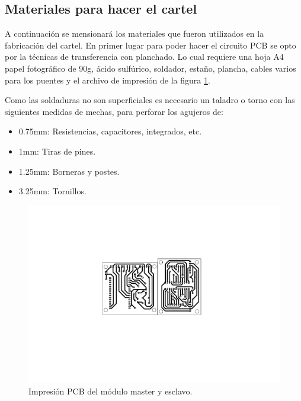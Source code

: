 \subsection{Materiales para hacer el cartel}

 A continuación se mensionará los materiales que fueron utilizados en la fabricación del cartel.
 En primer lugar para poder hacer el circuito PCB se opto por la técnicas de transferencia con planchado.
 Lo cual requiere una hoja A4 papel fotográfico de 90g, ácido sulfúrico, soldador, estaño, plancha, cables varios para los puentes y el archivo de impresión de la figura \ref{fig:imp-pcb}.

 Como las soldaduras no son superficiales es necesario un taladro o torno con las siguientes medidas de mechas, para perforar los agujeros de:
 \begin{itemize}
     \item 0.75mm: Resistencias, capacitores, integrados, etc.
     \item 1mm: Tiras de pines.
     \item 1.25mm: Borneras y postes.
     \item 3.25mm: Tornillos.
 \end{itemize}

 \begin{figure}[ht!]
	\centering
	\includegraphics[width=\linewidth]{imagenes/hw/imp.pdf}
	\caption{Impresión PCB del módulo master y esclavo.}
	\label{fig:imp-pcb}
\end{figure}